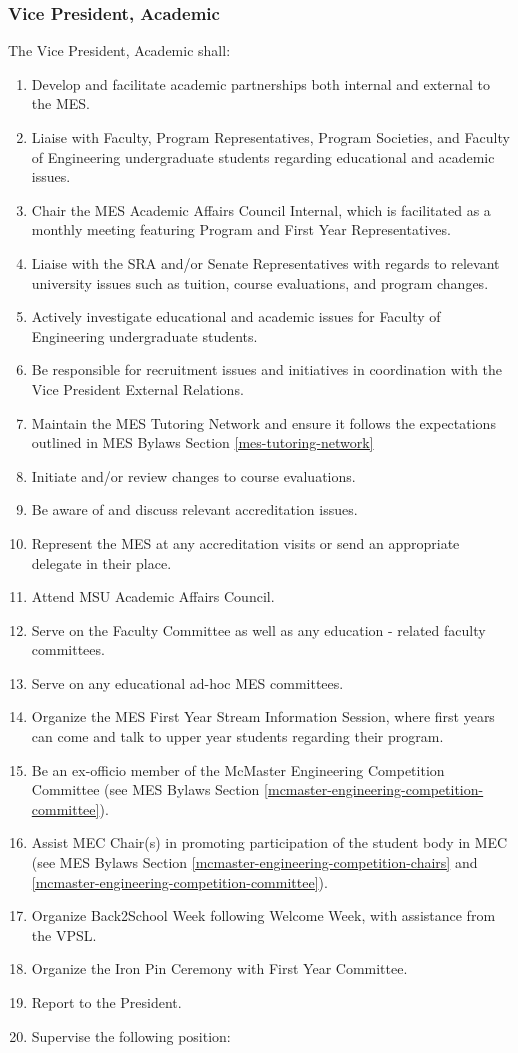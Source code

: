 \subsubsection{Vice President,
 Academic}
\label{vice-president-academic}
The Vice President, Academic shall:

\begin{enumerate}
 \item
  Develop and facilitate academic partnerships both internal and
  external to the MES.
 \item
  Liaise with Faculty, Program Representatives, Program Societies, and
  Faculty of Engineering undergraduate students regarding educational
  and academic issues.
 \item
  Chair the MES Academic Affairs Council Internal, which is facilitated
  as a monthly meeting featuring Program and First Year Representatives.
 \item
  Liaise with the SRA and/or Senate Representatives with regards to
  relevant university issues such as tuition, course evaluations, and
  program changes.
 \item
  Actively investigate educational and academic issues for Faculty of
  Engineering undergraduate students.
 \item
  Be responsible for recruitment issues and initiatives in coordination
  with the Vice President External Relations.
 \item
  Maintain the MES Tutoring Network and ensure it follows the
  expectations outlined in MES Bylaws Section \ref{mes-tutoring-network}
 \item
  Initiate and/or review changes to course evaluations.
 \item
  Be aware of and discuss relevant accreditation issues.
 \item
  Represent the MES at any accreditation visits or send an appropriate
  delegate in their place.
 \item
  Attend MSU Academic Affairs Council.
 \item
  Serve on the Faculty Committee as well as any education - related
  faculty committees.
 \item
  Serve on any educational ad-hoc MES committees.
 \item
  Organize the MES First Year Stream Information Session, where first
  years can come and talk to upper year students regarding their
  program.
 \item
  Be an ex-officio member of the McMaster Engineering Competition
  Committee (see MES Bylaws Section
  \ref{mcmaster-engineering-competition-committee}).
 \item
  Assist MEC Chair(s) in promoting participation of the student body in
  MEC (see MES Bylaws Section
  \ref{mcmaster-engineering-competition-chairs} and
  \ref{mcmaster-engineering-competition-committee}).
 \item
  Organize Back2School Week following Welcome Week, with assistance from
  the VPSL.
 \item
  Organize the Iron Pin Ceremony with First Year Committee.
 \item
  Report to the President.
 \item
  Supervise the following position:


\end{enumerate}

